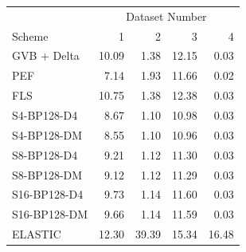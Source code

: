 \begin{tabular}{lrrrr}
\toprule
 & \multicolumn{4}{c}{Dataset Number} \\
Scheme & 1 & 2 & 3 & 4 \\
\midrule
GVB + Delta & 10.09 & 1.38 & 12.15 & 0.03 \\
PEF & 7.14 & 1.93 & 11.66 & 0.02 \\
FLS & 10.75 & 1.38 & 12.38 & 0.03 \\
S4-BP128-D4 & 8.67 & 1.10 & 10.98 & 0.03 \\
S4-BP128-DM & 8.55 & 1.10 & 10.96 & 0.03 \\
S8-BP128-D4 & 9.21 & 1.12 & 11.30 & 0.03 \\
S8-BP128-DM & 9.12 & 1.12 & 11.29 & 0.03 \\
S16-BP128-D4 & 9.73 & 1.14 & 11.60 & 0.03 \\
S16-BP128-DM & 9.66 & 1.14 & 11.59 & 0.03 \\
ELASTIC & 12.30 & 39.39 & 15.34 & 16.48 \\
\bottomrule
\end{tabular}
